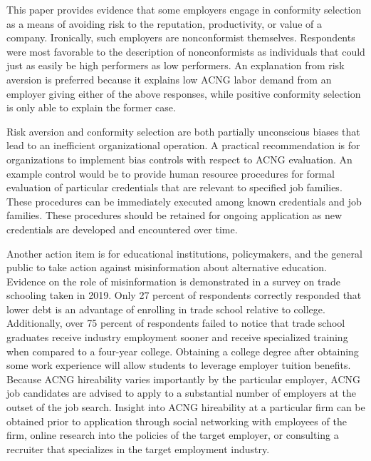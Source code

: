 \documentclass[review]{elsarticle}
\begin{document}
This paper provides evidence that some employers engage in conformity selection as a means of avoiding risk to the reputation, productivity, or value of a company.
Ironically, such employers are nonconformist themselves.
Respondents were most favorable to the description of nonconformists as individuals that could just as easily be high performers as low performers.
An explanation from risk aversion is preferred because it explains low ACNG labor demand from an employer giving either of the above responses,
while positive conformity selection is only able to explain the former case.

Risk aversion and conformity selection are both partially unconscious biases that lead to an inefficient organizational operation.
A practical recommendation is for organizations to implement bias controls with respect to ACNG evaluation.
An example control would be to provide human resource procedures for formal evaluation of particular credentials that are relevant to specified job families.
These procedures can be immediately executed among known credentials and job families.
These procedures should be retained for ongoing application as new credentials are developed and encountered over time.

Another action item is for educational institutions, policymakers, and the general public to take action against misinformation about alternative education.
Evidence on the role of misinformation is demonstrated in a survey on trade schooling taken in 2019\cite{arabia_2019}.
Only 27 percent of respondents correctly responded that lower debt is an advantage of enrolling in trade school relative to college.
Additionally, over 75 percent of respondents failed to notice that trade school graduates receive industry employment sooner
and receive specialized training when compared to a four-year college.
Obtaining a college degree after obtaining some work experience will allow students to leverage employer tuition benefits.
Because ACNG hireability varies importantly by the particular employer, ACNG job candidates are advised to apply to a substantial number of employers at the outset of the job search.
Insight into ACNG hireability at a particular firm can be obtained prior to application through social networking with employees of the firm,
online research into the policies of the target employer,
or consulting a recruiter that specializes in the target employment industry.
\end{document}
